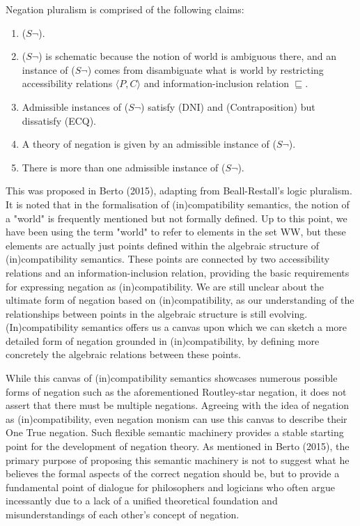 Negation pluralism is comprised of the following claims:
\begin{enumerate}[label=(\arabic*)]
    \item ($S\neg$).
    \item ($S\neg$) is schematic because the notion of world is ambiguous there, and an instance of ($S\neg$) comes from disambiguate what is world by restricting accessibility relations $\langle P, C \rangle$ and information-inclusion relation $\sqsubseteq$.
    \item Admissible instances of ($S\neg$) satisfy (DNI) and (Contraposition) but dissatisfy (ECQ).
    \item A theory of negation is given by an admissible instance of ($S\neg$).
    \item There is more than one admissible instance of ($S\neg$).
\end{enumerate}
This was proposed in Berto (2015), adapting from Beall-Restall's logic pluralism. It is noted that in the formalisation of (in)compatibility semantics, the notion of a "world" is frequently mentioned but not formally defined. Up to this point, we have been using the term "world" to refer to elements in the set WW, but these elements are actually just points defined within the algebraic structure of (in)compatibility semantics. These points are connected by two accessibility relations and an information-inclusion relation, providing the basic requirements for expressing negation as (in)compatibility. We are still unclear about the ultimate form of negation based on (in)compatibility, as our understanding of the relationships between points in the algebraic structure is still evolving. (In)compatibility semantics offers us a canvas upon which we can sketch a more detailed form of negation grounded in (in)compatibility, by defining more concretely the algebraic relations between these points.

While this canvas of (in)compatibility semantics showcases numerous possible forms of negation such as the aforementioned Routley-star negation, it does not assert that there must be multiple negations. Agreeing with the idea of negation as (in)compatibility, even negation monism can use this canvas to describe their One True negation. Such flexible semantic machinery provides a stable starting point for the development of negation theory. As mentioned in Berto (2015), the primary purpose of proposing this semantic machinery is not to suggest what he believes the formal aspects of the correct negation should be, but to provide a fundamental point of dialogue for philosophers and logicians who often argue incessantly due to a lack of a unified theoretical foundation and misunderstandings of each other’s concept of negation.

